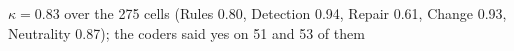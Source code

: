 $\kappa = 0.83$ over the 275 cells (Rules 0.80, Detection 0.94, Repair 0.61, Change 0.93, Neutrality 0.87); the coders said yes on 51 and 53 of them